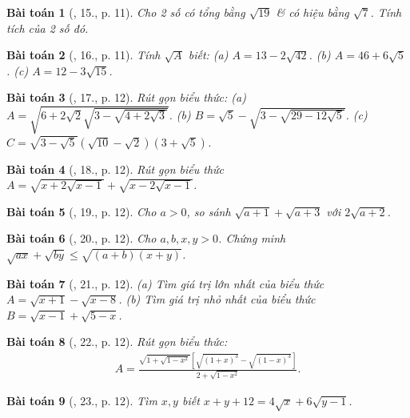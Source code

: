 \documentclass{article}
\newtheorem{baitoan}{Bài toán}
\begin{document}
\begin{baitoan}[\cite{Tuyen_Toan_9}, 15., p. 11]
	Cho 2 số có tổng bằng $\sqrt{19}$ \& có hiệu bằng $\sqrt{7}$. Tính tích của 2 số đó.
\end{baitoan}

\begin{baitoan}[\cite{Tuyen_Toan_9}, 16., p. 11]
	Tính $\sqrt{A}$ biết: (a) $A = 13 - 2\sqrt{42}$. (b) $A = 46 + 6\sqrt{5}$. (c) $A = 12 - 3\sqrt{15}$.
\end{baitoan}

\begin{baitoan}[\cite{Tuyen_Toan_9}, 17., p. 12]
	Rút gọn biểu thức: (a) $A = \sqrt{6 + 2\sqrt{2}\sqrt{3 - \sqrt{4 + 2\sqrt{3}}}}$. (b) $B = \sqrt{5} - \sqrt{3 - \sqrt{29 - 12\sqrt{5}}}$. (c) $C = \sqrt{3 - \sqrt{5}}(\sqrt{10} - \sqrt{2})(3 + \sqrt{5})$.
\end{baitoan}

\begin{baitoan}[\cite{Tuyen_Toan_9}, 18., p. 12]
	Rút gọn biểu thức $A = \sqrt{x + 2\sqrt{x - 1}} + \sqrt{x - 2\sqrt{x - 1}}$.
\end{baitoan}

\begin{baitoan}[\cite{Tuyen_Toan_9}, 19., p. 12]
	Cho $a > 0$, so sánh $\sqrt{a + 1} + \sqrt{a + 3}$ với $2\sqrt{a + 2}$.
\end{baitoan}

\begin{baitoan}[\cite{Tuyen_Toan_9}, 20., p. 12]
	Cho $a,b,x,y > 0$. Chứng minh $\sqrt{ax} + \sqrt{by}\le\sqrt{(a + b)(x + y)}$.
\end{baitoan}

\begin{baitoan}[\cite{Tuyen_Toan_9}, 21., p. 12]
	(a) Tìm giá trị lớn nhất của biểu thức $A = \sqrt{x + 1} - \sqrt{x - 8}$. (b) Tìm giá trị nhỏ nhất của biểu thức $B = \sqrt{x - 1} + \sqrt{5 - x}$.
\end{baitoan}

\begin{baitoan}[\cite{Tuyen_Toan_9}, 22., p. 12]
	Rút gọn biểu thức:
	\begin{align*}
		A = \frac{\sqrt{1 + \sqrt{1 - x^2}}\left[\sqrt{(1 + x)^3} - \sqrt{(1 - x)^3}\right]}{2 + \sqrt{1 - x^2}}.
	\end{align*}
\end{baitoan}

\begin{baitoan}[\cite{Tuyen_Toan_9}, 23., p. 12]
	Tìm $x,y$ biết $x + y + 12 = 4\sqrt{x} + 6\sqrt{y - 1}$.
\end{baitoan}
\end{document}
